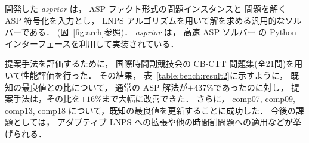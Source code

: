 開発した \textit{asprior} は，
ASP ファクト形式の問題インスタンスと
問題を解く ASP 符号化を入力とし，
LNPS アルゴリズムを用いて解を求める汎用的なソルバーである．
(図~\ref{fig:arch}参照)．
\textit{asprior} は，
高速 ASP ソルバー {\clingo}%
の Python インターフェースを利用して実装されている．

提案手法を評価するために，
国際時間割競技会の CB-CTT 問題集(全21問)を用いて性能評価を行った．
その結果，
表~\ref{table:bench:result2}に示すように，
既知の最良値との比について，
通常の ASP 解法が$+437\%$であったのに対し，
提案手法は，その比を$+16\%$まで大幅に改善できた．
%
さらに，
comp07,
comp09,
comp13,
comp18
について，既知の最良値を更新することに成功した．
今後の課題としては，
アダプティブ LNPS への拡張や他の時間割問題への適用などが挙げられる．

% 

%     



